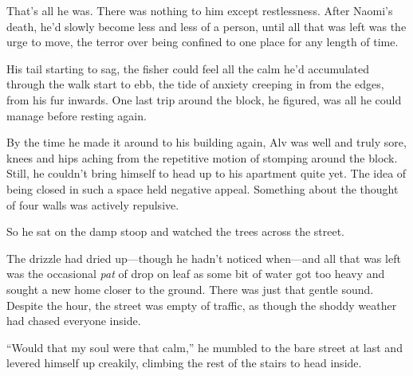 That's all he was. There was nothing to him except restlessness. After Naomi's death, he'd slowly become less and less of a person, until all that was left was the urge to move, the terror over being confined to one place for any length of time.

His tail starting to sag, the fisher could feel all the calm he'd accumulated through the walk start to ebb, the tide of anxiety creeping in from the edges, from his fur inwards. One last trip around the block, he figured, was all he could manage before resting again.

By the time he made it around to his building again, Alv was well and truly sore, knees and hips aching from the repetitive motion of stomping around the block. Still, he couldn't bring himself to head up to his apartment quite yet. The idea of being closed in such a space held negative appeal. Something about the thought of four walls was actively repulsive.

So he sat on the damp stoop and watched the trees across the street.

The drizzle had dried up---though he hadn't noticed when---and all that was left was the occasional \emph{pat} of drop on leaf as some bit of water got too heavy and sought a new home closer to the ground. There was just that gentle sound. Despite the hour, the street was empty of traffic, as though the shoddy weather had chased everyone inside.

``Would that my soul were that calm,'' he mumbled to the bare street at last and levered himself up creakily, climbing the rest of the stairs to head inside.
